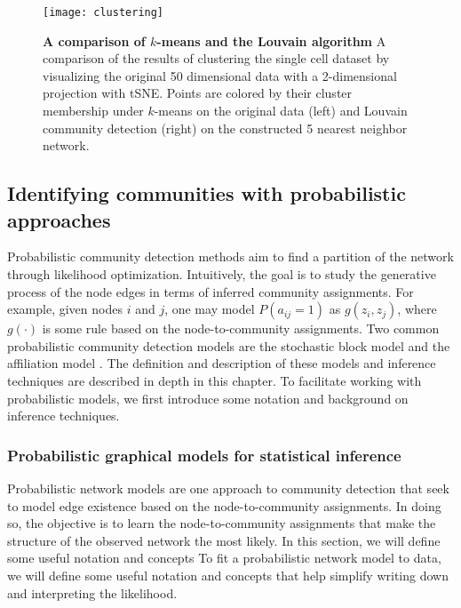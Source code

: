  \begin{figure}
\begin{center}
\texttt{[image: clustering]}
\caption{{\bf A comparison of $k$-means and the Louvain algorithm} A comparison of the results of clustering the single cell dataset by visualizing the original 50 dimensional data with a 2-dimensional projection with tSNE. Points are colored by their cluster membership under $k$-means on the original data (left) and Louvain community detection (right) on the constructed 5 nearest neighbor network.}
\label{fig:clustering}
\end{center}
\end{figure}

\subsection{Identifying communities with probabilistic approaches}

\indent Probabilistic community detection methods aim to find a partition of the network through likelihood optimization. Intuitively, the goal is to study the generative process of the node edges in terms of inferred community assignments. For example, given nodes $i$ and $j$, one may model $P(a_{ij}=1)$ as $g(z_{i},z_{j})$, where $g(\cdot)$ is some rule based on the node-to-community assignments. Two common probabilistic community detection models are the stochastic block model \cite{originalSBM} and the affiliation model \cite{affil}. The definition and description of these models and inference techniques are described in depth in this chapter. To facilitate working with probabilistic models, we first introduce some notation and background on inference techniques. 

\subsubsection{Probabilistic graphical models for statistical inference}
\label{pgm}
Probabilistic network models are one approach to community detection that seek to model edge existence based on the node-to-community assignments. In doing so, the objective is to learn the node-to-community assignments that make the structure of the observed network the most likely. In this section, we will define some useful notation and concepts  To fit a probabilistic network model to data, we will define some useful notation and concepts that help simplify writing down and interpreting the likelihood. 


